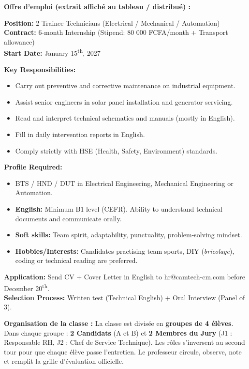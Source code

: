 \documentclass[11pt]{article}
\begin{document}
\textbf{Offre d'emploi (extrait affiché au tableau / distribué) :}

\begin{aretenir}
\textbf{Position:} 2 Trainee Technicians (Electrical / Mechanical / Automation)\\
\textbf{Contract:} 6-month Internship (Stipend: 80 000 FCFA/month + Transport allowance)\\
\textbf{Start Date:} January 15\textsuperscript{th}, 2027

\textbf{Key Responsibilities:}
\begin{itemize}
    \item Carry out preventive and corrective maintenance on industrial equipment.
    \item Assist senior engineers in solar panel installation and generator servicing.
    \item Read and interpret technical schematics and manuals (mostly in English).
    \item Fill in daily intervention reports in English.
    \item Comply strictly with HSE (Health, Safety, Environment) standards.
\end{itemize}
\textbf{Profile Required:}
\begin{itemize}
    \item BTS / HND / DUT in Electrical Engineering, Mechanical Engineering or Automation.
    \item \textbf{English:} Minimum B1 level (CEFR). Ability to understand technical documents and communicate orally.
    \item \textbf{Soft skills:} Team spirit, adaptability, punctuality, problem-solving mindset.
    \item \textbf{Hobbies/Interests:} Candidates practising team sports, DIY (\textit{bricolage}), coding or technical reading are preferred.
\end{itemize}
\textbf{Application:} Send CV + Cover Letter in English to hr@camtech-cm.com before December 20\textsuperscript{th}.\\
\textbf{Selection Process:} Written test (Technical English) + Oral Interview (Panel of 3).
\end{aretenir}

\textbf{Organisation de la classe :} La classe est divisée en \textbf{groupes de 4 élèves}. Dans chaque groupe : \textbf{2 Candidats} (A et B) et \textbf{2 Membres du Jury} (J1 : Responsable RH, J2 : Chef de Service Technique). Les rôles s'inversent au second tour pour que chaque élève passe l'entretien. Le professeur circule, observe, note et remplit la grille d'évaluation officielle.
\end{document}
